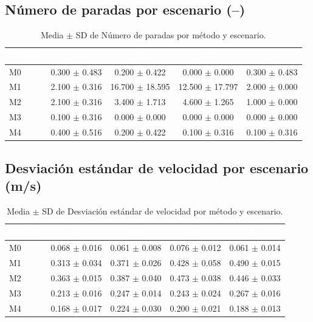 \documentclass[12pt,a4paper,oneside]{book}
\begin{document}
\subsection{Número de paradas por escenario (--)}

\begin{table}[H]
\centering
\small
\caption{Media $\pm$ SD de Número de paradas por método y escenario.}
\begin{tabular}{lcccc}
\toprule
\rowcolor{primary}
\textcolor{white}{\textbf{Método}} & \textcolor{white}{\textbf{E1}} & \textcolor{white}{\textbf{E2}} & \textcolor{white}{\textbf{E3}} & \textcolor{white}{\textbf{E4}} \\
\midrule
M0 & 0.300 $\pm$ 0.483 & 0.200 $\pm$ 0.422 & 0.000 $\pm$ 0.000 & 0.300 $\pm$ 0.483 \\
M1 & 2.100 $\pm$ 0.316 & 16.700 $\pm$ 18.595 & 12.500 $\pm$ 17.797 & 2.000 $\pm$ 0.000 \\
M2 & 2.100 $\pm$ 0.316 & 3.400 $\pm$ 1.713 & 4.600 $\pm$ 1.265 & 1.000 $\pm$ 0.000 \\
M3 & 0.100 $\pm$ 0.316 & 0.000 $\pm$ 0.000 & 0.000 $\pm$ 0.000 & 0.000 $\pm$ 0.000 \\
M4 & 0.400 $\pm$ 0.516 & 0.200 $\pm$ 0.422 & 0.100 $\pm$ 0.316 & 0.100 $\pm$ 0.316 \\
\bottomrule
\end{tabular}
\end{table}

\subsection{Desviación estándar de velocidad por escenario (m/s)}

\begin{table}[H]
\centering
\small
\caption{Media $\pm$ SD de Desviación estándar de velocidad por método y escenario.}
\begin{tabular}{lcccc}
\toprule
\rowcolor{primary}
\textcolor{white}{\textbf{Método}} & \textcolor{white}{\textbf{E1}} & \textcolor{white}{\textbf{E2}} & \textcolor{white}{\textbf{E3}} & \textcolor{white}{\textbf{E4}} \\
\midrule
M0 & 0.068 $\pm$ 0.016 & 0.061 $\pm$ 0.008 & 0.076 $\pm$ 0.012 & 0.061 $\pm$ 0.014 \\
M1 & 0.313 $\pm$ 0.034 & 0.371 $\pm$ 0.026 & 0.428 $\pm$ 0.058 & 0.490 $\pm$ 0.015 \\
M2 & 0.363 $\pm$ 0.015 & 0.387 $\pm$ 0.040 & 0.473 $\pm$ 0.038 & 0.446 $\pm$ 0.033 \\
M3 & 0.213 $\pm$ 0.016 & 0.247 $\pm$ 0.014 & 0.243 $\pm$ 0.024 & 0.267 $\pm$ 0.016 \\
M4 & 0.168 $\pm$ 0.017 & 0.224 $\pm$ 0.030 & 0.200 $\pm$ 0.021 & 0.188 $\pm$ 0.013 \\
\bottomrule
\end{tabular}
\end{table}
\end{document}
